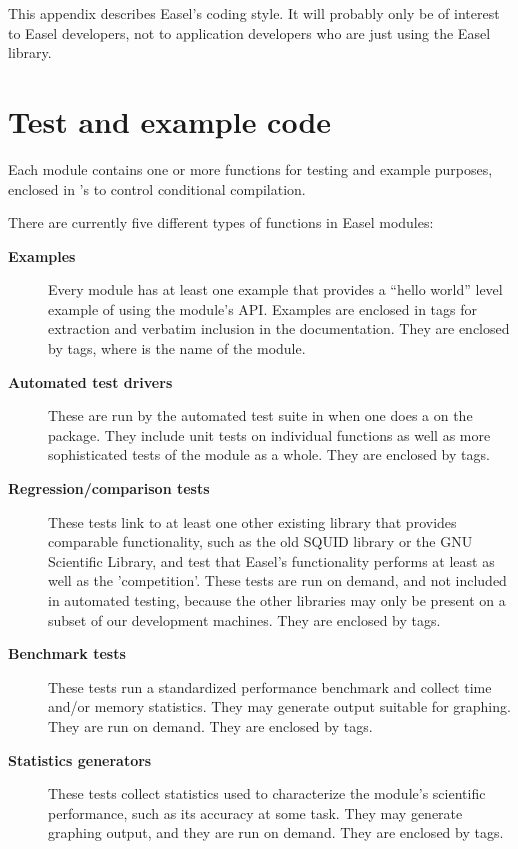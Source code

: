 
This appendix describes Easel's coding style. It will probably only be
of interest to Easel developers, not to application developers who are
just using the Easel library.

\section{Test and example code}

Each module contains one or more  functions for testing
and example purposes, enclosed in 's to control
conditional compilation.

There are currently five different types of  functions
in Easel modules:

\begin{description} 

\item[\textbf{Examples}] Every module has at least one example
   that provides a ``hello world'' level example of
  using the module's API. Examples are enclosed in 
  tags for extraction and verbatim inclusion in the documentation.
  They are enclosed by  tags, where
   is the name of the module.

\item[\textbf{Automated test drivers}] These are run by the automated
  test suite in  when one does a
   on the package. They include unit tests on
  individual functions as well as more sophisticated tests of the
  module as a whole. They are enclosed by  tags.

\item[\textbf{Regression/comparison tests}] These tests link to at
  least one other existing library that provides comparable
  functionality, such as the old SQUID library or the GNU Scientific
  Library, and test that Easel's functionality performs at least as
  well as the 'competition'. These tests are run on demand, and not
  included in automated testing, because the other libraries may only
  be present on a subset of our development machines. They are
  enclosed by  tags.

\item[\textbf{Benchmark tests}] These tests run a standardized
  performance benchmark and collect time and/or memory
  statistics. They may generate output suitable for graphing. They are
  run on demand. They are enclosed by  tags.

\item[\textbf{Statistics generators}] These tests collect statistics
  used to characterize the module's scientific performance, such as
  its accuracy at some task. They may generate graphing output, and they
  are run on demand. They are enclosed by  tags.
\end{description}  

